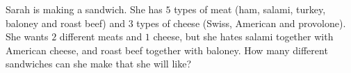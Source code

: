 Sarah is making a sandwich. She has $5$ types of meat (ham, salami, turkey, baloney and roast beef) and $3$ types of cheese (Swiss, American and provolone). She wants $2$ different meats and $1$ cheese, but she hates salami together with American cheese, and roast beef together with baloney. How many different sandwiches can she make that she will like?
